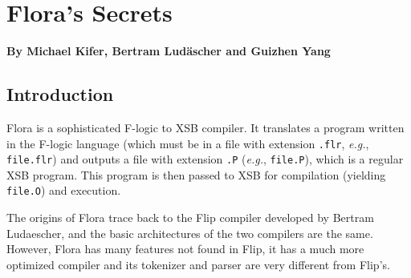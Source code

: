 \documentclass[11pt]{report}
\begin{document}
\newcommand{\FdConstr}{\ensuremath{\stackrel{constr}{\Fd}}}
\newcommand{\MvdConstr}{\ensuremath{\stackrel{constr}{\Mvd}}}

\newlength{\flogicindent}


\newlength{\flength}
\newlength{\counterlength}


\newcommand{\la}{\ensuremath{\,\leftarrow\,}}

\newcommand{\anon}{\_}

\newcommand{\note}[1]{\textit{[[#1]]}}
\newcommand{\nterm}[1]{\ensuremath{\langle}\textit{#1}\ensuremath{\rangle}}


\newcommand{\NI}{\noindent}

\newcommand{\bs}{\ensuremath{\backslash}}
\newcommand{\FLIP}{{\mbox{\sc Flip}}\xspace}
\newcommand{\FLORA}{{\mbox{\sc Flora}}\xspace}
\newcommand{\FLORID}{{\mbox{\sc Florid}}\xspace}
\newcommand{\fl}{{F-logic}\xspace}


\newcommand{\consts}{\ensuremath{\mathcal{C}}}
\newcommand{\funcs}{\ensuremath{\mathcal{F}}}
\newcommand{\preds}{\ensuremath{\mathcal{P}}}
\newcommand{\vars}{\ensuremath{\mathcal{V}}}

\newcommand{\HU}{\ensuremath{U}}
\newcommand{\HB}{\ensuremath{\mathcal{HB}}}
\newcommand{\ext}{\ensuremath{^{\star}}}

\newcommand{\bksl}{\symbol{92}}
\newcommand{\dq}{\symbol{34}}


\chapter{\FLORA's Secrets}

\begin{center}
{\Large {\bf By Michael Kifer, Bertram Lud\"ascher and Guizhen Yang}}
\end{center}

\section{Introduction}

\FLORA is a sophisticated F-logic to XSB compiler. It translates a program
written in the F-logic language \cite{KLW95} (which must be in a file with
extension {\tt .flr}, {\it e.g.}, {\tt file.flr}) and outputs a file with
extension {\tt .P} ({\it e.g.}, {\tt file.P}), which is a regular XSB
program. This program is then passed to XSB for compilation (yielding {\tt
  file.O}) and execution.

The origins of \FLORA trace back to the \FLIP compiler developed by Bertram
Ludaescher, and the basic architectures of the two compilers are the same.
However, \FLORA has many features not found in \FLIP, it has a much more
optimized compiler and its tokenizer and parser are very different from
\FLIP's.
\end{document}
